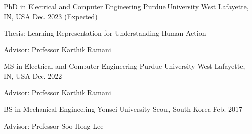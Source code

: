 


\begin{cventries}


    \cventry
    {PhD in Electrical and Computer Engineering} %
    {Purdue University} %
    {West Lafayette, IN, USA} %
    {Dec. 2023 (Expected)} %
    { %
    \begin{cvitems}
        \item {Thesis: Learning Representation for Understanding Human Action}
        \item {Advisor: Professor Karthik Ramani}
    \end{cvitems}
    }

    \cventry
    {MS in Electrical and Computer Engineering} %
    {Purdue University} %
    {West Lafayette, IN, USA} %
    {Dec. 2022} %
    { %
    \begin{cvitems}
        \item {Advisor: Professor Karthik Ramani}
    \end{cvitems}
    }

    \cventry
    {BS in Mechanical Engineering} %
    {Yonsei University} %
    {Seoul, South Korea} %
    {Feb. 2017} %
    { %
    \begin{cvitems}
        \item {Advisor: Professor Soo-Hong Lee}
    \end{cvitems}
    }

\end{cventries}
